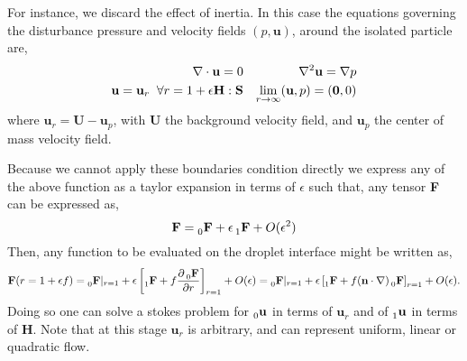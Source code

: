 \documentclass[12pt]{My_preprint}
\begin{document}
For instance, we discard the effect of inertia. 
In this case the equations governing the disturbance pressure and velocity fields $(p,\textbf{u})$, around the isolated particle are, 
\begin{align}
    \mathbf{\nabla}\cdot \textbf{u}= 0&& \mathbf{\nabla}^2 \textbf{u}=\mathbf{\nabla} p\\
    \textbf{u} = \textbf{u}_r\;\; \forall r = 1+\epsilon \textbf{H}:\textbf{S} 
    && \lim_{r\to \infty} (\textbf{u},p) = (\textbf{0},0)
\end{align}
where $\textbf{u}_r = \textbf{U}-   \textbf{u}_p$, with \textbf{U} the background velocity field, and $\textbf{u}_p$ the center of mass velocity field. 

Because we cannot apply these boundaries condition directly we express any of the above function as a taylor expansion in terms of $\epsilon$ such that, any tensor \textbf{F} can be expressed as, 
\begin{equation}
    \textbf{F}
    = \prescript{}{0}{\textbf{F}}
    + \epsilon \prescript{}{1}{\textbf{F}}
    + O(\epsilon^2)
\end{equation}
Then, any function to be evaluated on the droplet interface might be written as, 
\begin{equation}
    \textbf{F}(r=1+\epsilon f)
    =
    \prescript{}{0}{\textbf{F}}|_{r=1}
    + \epsilon \left[\prescript{}{1}{\textbf{F}}
    + f \frac{\partial\prescript{}{0}{\textbf{F}}}{\partial r}\right]_{r=1}
    + O(\epsilon)
    =
    \prescript{}{0}{\textbf{F}}|_{r=1}
    + \epsilon \left[\prescript{}{1}{\textbf{F}}
    + f (\textbf{n}\cdot \mathbf{\nabla}) \prescript{}{0}{\textbf{F}} \right]_{r=1}
    + O(\epsilon). 
\end{equation}
Doing so one can solve a stokes problem for $\prescript{}{0}{\textbf{u}}$ in terms of $\textbf{u}_r$ and of $\prescript{}{1}{\textbf{u}}$ in terms of $\textbf{H}$. 
Note that at this stage $\textbf{u}_r$ is arbitrary, and can represent uniform, linear or quadratic flow. 
\end{document}

